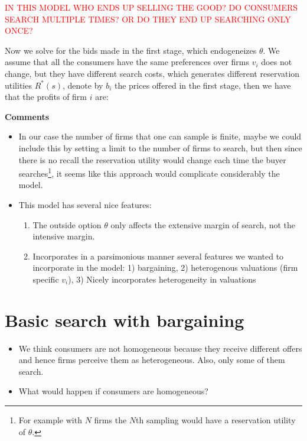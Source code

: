 \documentclass[12pt]{article}
\theoremstyle{plain}
\theoremstyle{plain}
\begin{document}
\vspace{3cm}

\textcolor{red}{IN THIS MODEL WHO ENDS UP SELLING THE GOOD? DO CONSUMERS SEARCH MULTIPLE TIMES? OR DO THEY END UP SEARCHING ONLY ONCE?}






Now we solve for the bids made in the first stage, which endogeneizes $\theta$. We assume that all the consumers have the same preferences over firms $v_i$ does not change, but they have different search costs, which generates different reservation utilities $R^*(s)$, denote by $b_i$ the prices offered in the first stage, then we have that the profits of firm $i$ are: 



\textbf{Comments} 
\begin{itemize}
    \item In our case the number of firms that one can sample is finite, maybe we could include this by setting a limit to the number of firms to search, but then since there is no recall the reservation utility would change each time the buyer searches\footnote{For example with $N$ firms the $N$th sampling would have a reservation utility of $\theta$.}, it seems like this approach would complicate considerably the model. 

    \item This model has several nice features: 
    \begin{enumerate}
        \item The outside option $\theta$ only affects the extensive margin of search, not the intensive margin. 
        \item Incorporates in a parsimonious manner several features we wanted to incorporate in the model: 1) bargaining, 2) heterogenous valuations (firm specific $v_i$), 3) Nicely incorporates heterogeneity in valuations  
    \end{enumerate}
\end{itemize}



\section{Basic search with bargaining}\label{sec:basic1}

\begin{itemize}
    \item We think consumers are not homogeneous because they receive different offers and hence firms perceive them as heterogeneous. Also, only some of them search.
    \item What would happen if consumers are homogeneous?
\end{itemize}
\end{document}
